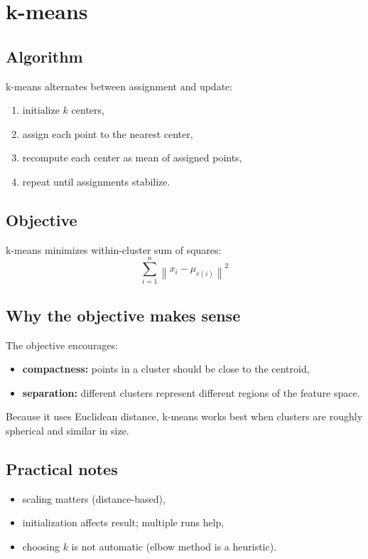 \documentclass[11pt]{article}
\begin{document}
\section{k-means}
\subsection{Algorithm}
k-means alternates between assignment and update:
\begin{enumerate}[leftmargin=*]
  \item initialize $k$ centers,
  \item assign each point to the nearest center,
  \item recompute each center as mean of assigned points,
  \item repeat until assignments stabilize.
\end{enumerate}

\subsection{Objective}
k-means minimizes within-cluster sum of squares:
\[
  \sum_{i=1}^{n}\left\|x_i - \mu_{c(i)}\right\|^2
\]

\subsection{Why the objective makes sense}
The objective encourages:
\begin{itemize}[leftmargin=*]
  \item \textbf{compactness:} points in a cluster should be close to the centroid,
  \item \textbf{separation:} different clusters represent different regions of the feature space.
\end{itemize}
Because it uses Euclidean distance, k-means works best when clusters are roughly spherical and similar in size.

\subsection{Practical notes}
\begin{itemize}[leftmargin=*]
  \item scaling matters (distance-based),
  \item initialization affects result; multiple runs help,
  \item choosing $k$ is not automatic (elbow method is a heuristic).
\end{itemize}
\end{document}
